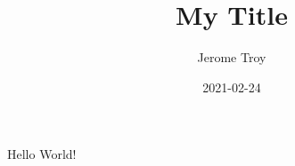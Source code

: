 \documentclass{article}
\title{My Title}
\author{Jerome Troy}
\date{ 2021-02-24 }
\begin{document}
\maketitle

Hello World!
\end{document}
